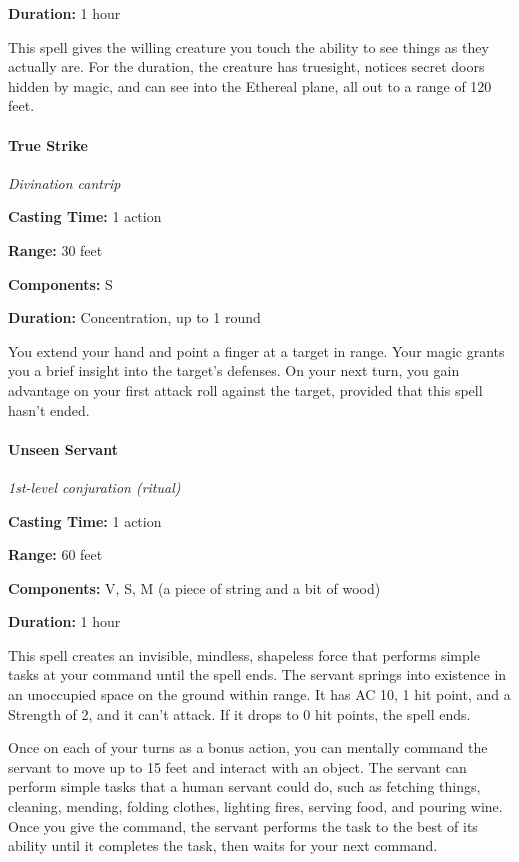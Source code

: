 \documentclass[
]{article}
\begin{document}
\textbf{Duration:} 1 hour

This spell gives the willing creature you touch the ability to see
things as they actually are. For the duration, the creature has
truesight, notices secret doors hidden by magic, and can see into the
Ethereal plane, all out to a range of 120 feet.

\hypertarget{true-strike}{%
\paragraph{True Strike}\label{true-strike}}

\emph{Divination cantrip}

\textbf{Casting Time:} 1 action

\textbf{Range:} 30 feet

\textbf{Components:} S

\textbf{Duration:} Concentration, up to 1 round

You extend your hand and point a finger at a target in range. Your magic
grants you a brief insight into the target's defenses. On your next
turn, you gain advantage on your first attack roll against the target,
provided that this spell hasn't ended.

\hypertarget{unseen-servant}{%
\paragraph{Unseen Servant}\label{unseen-servant}}

\emph{1st-level conjuration (ritual)}

\textbf{Casting Time:} 1 action

\textbf{Range:} 60 feet

\textbf{Components:} V, S, M (a piece of string and a bit of wood)

\textbf{Duration:} 1 hour

This spell creates an invisible, mindless, shapeless force that performs
simple tasks at your command until the spell ends. The servant springs
into existence in an unoccupied space on the ground within range. It has
AC 10, 1 hit point, and a Strength of 2, and it can't attack. If it
drops to 0 hit points, the spell ends.

Once on each of your turns as a bonus action, you can mentally command
the servant to move up to 15 feet and interact with an object. The
servant can perform simple tasks that a human servant could do, such as
fetching things, cleaning, mending, folding clothes, lighting fires,
serving food, and pouring wine. Once you give the command, the servant
performs the task to the best of its ability until it completes the
task, then waits for your next command.
\end{document}
